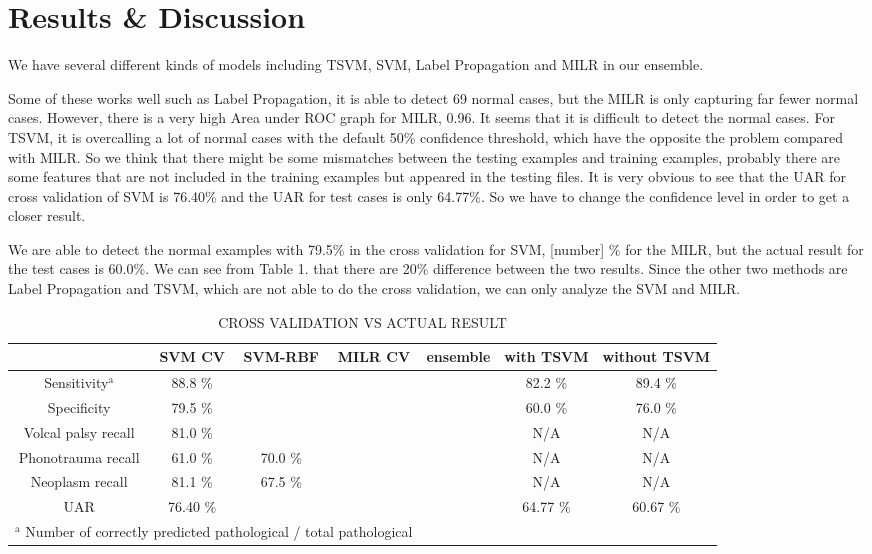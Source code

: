 \section{Results \& Discussion}


We have several different kinds of models including TSVM, SVM, Label Propagation and MILR in our ensemble. 

Some of these works well such as Label Propagation, it is able to detect 69 normal cases, but the MILR is only capturing far fewer normal cases. However, there is a very high Area under ROC graph for MILR, 0.96. It seems that it is difficult to detect the normal cases. For TSVM, it is overcalling a lot of normal cases with the default 50\% confidence threshold, which have the opposite the problem compared with MILR. So we think that there might be some mismatches between the testing examples and training examples, probably there are some features that are not included in the training examples but appeared in the testing files. It is very obvious to see that the UAR for cross validation of SVM is 76.40\% and the UAR for test cases is only 64.77\%. So we have to change the confidence level in order to get a closer result.

We are able to detect the normal examples with 79.5\% in the cross validation for SVM, [number] \% for the MILR, but the actual result for the test cases is 60.0\%. We can see from Table 1. that there are 20\% difference between the two results. Since the other two methods are Label Propagation and TSVM, which are not able to do the cross validation, we can only analyze the SVM and MILR.


\begin{table*}[!htbp]
	\caption{CROSS VALIDATION VS ACTUAL RESULT}
	\begin{center}
		\begin{tabular}{|c|c|c|c|c|c|c|}
			\hline
			 & SVM CV & SVM-RBF & MILR CV & ensemble & with TSVM & without TSVM \\
			\hline
			Sensitivity$^{\mathrm{a}}$  & 88.8 \%& && & 82.2 \% & 89.4 \% \\
			\hline
			Specificity & 79.5 \% &&&& 60.0 \% & 76.0 \% \\
			\hline
			Volcal palsy recall & 81.0 \% && && N/A & N/A \\
			\hline
			Phonotrauma recall & 61.0 \% &70.0 \%&&& N/A& N/A\\
			\hline
			Neoplasm recall & 81.1 \% &67.5 \%&&& N/A& N/A \\
			\hline
			UAR & 76.40 \% & && & 64.77 \% & 60.67 \%\\
			\hline
			\multicolumn{4}{l}{$^{\mathrm{a}}$ Number of correctly predicted pathological / total pathological}
		\end{tabular}
		\label{tab2}
	\end{center}
\end{table*}

